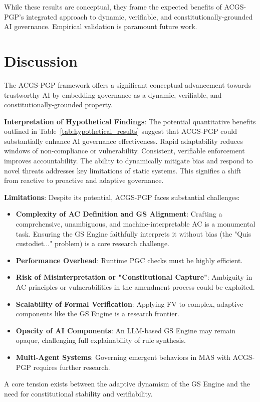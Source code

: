 \documentclass[sigconf,review,anonymous=false]{acmart} %
\begin{document}
While these results are conceptual, they frame the expected benefits of ACGS-PGP's integrated approach to dynamic, verifiable, and constitutionally-grounded AI governance. Empirical validation is paramount future work.

\section{Discussion}
\label{sec:discussion}
The ACGS-PGP framework offers a significant conceptual advancement towards trustworthy AI by embedding governance as a dynamic, verifiable, and constitutionally-grounded property.

\textbf{Interpretation of Hypothetical Findings}: The potential quantitative benefits outlined in Table~\ref{tab:hypothetical_results} suggest that ACGS-PGP could substantially enhance AI governance effectiveness. Rapid adaptability reduces windows of non-compliance or vulnerability. Consistent, verifiable enforcement improves accountability. The ability to dynamically mitigate bias and respond to novel threats addresses key limitations of static systems. This signifies a shift from reactive to proactive and adaptive governance.

\textbf{Limitations}: Despite its potential, ACGS-PGP faces substantial challenges:
\begin{itemize}
    \item \textbf{Complexity of AC Definition and GS Alignment}: Crafting a comprehensive, unambiguous, and machine-interpretable AC is a monumental task. Ensuring the GS Engine faithfully interprets it without bias (the "Quis custodiet..." problem) is a core research challenge.
    \item \textbf{Performance Overhead}: Runtime PGC checks must be highly efficient.
    \item \textbf{Risk of Misinterpretation or "Constitutional Capture"}: Ambiguity in AC principles or vulnerabilities in the amendment process could be exploited.
    \item \textbf{Scalability of Formal Verification}: Applying FV to complex, adaptive components like the GS Engine is a research frontier.
    \item \textbf{Opacity of AI Components}: An LLM-based GS Engine may remain opaque, challenging full explainability of rule synthesis.
    \item \textbf{Multi-Agent Systems}: Governing emergent behaviors in MAS with ACGS-PGP requires further research.
\end{itemize}
A core tension exists between the adaptive dynamism of the GS Engine and the need for constitutional stability and verifiability.
\end{document}
